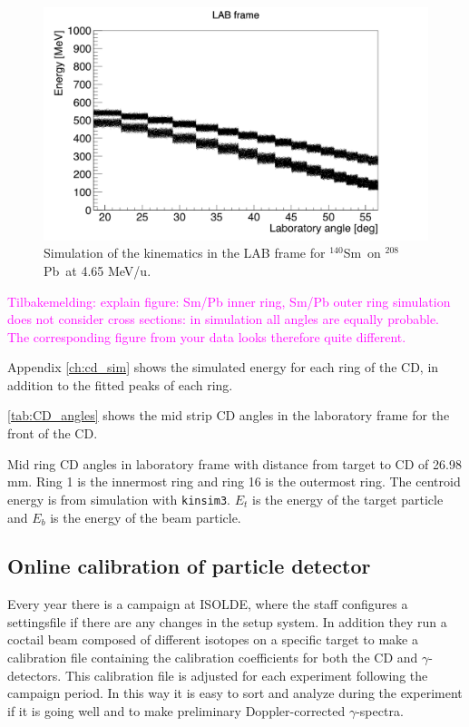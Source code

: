 \documentclass[twoside,english]{uiofysmaster/uiofysmaster}
\newcommand{\Sm}{$^{140}$Sm} %
\newcommand{\Pb}{$^{208}$Pb}
\newcommand{\ga}{$\gamma$}
\begin{document}
\begin{figure}[ht]
	\centering
    \includegraphics[width=\linewidth]{../Plots/simulation/kin_140Sm_208Pb.png}
	\caption{Simulation of the kinematics in the LAB frame for \Sm\ on \Pb\ at 4.65 MeV/u.}
	\label{fig:kinsim}
\end{figure}

\textcolor{Magenta}{Tilbakemelding: \newline 
explain figure: Sm/Pb inner ring, Sm/Pb outer ring \newline
simulation does not consider cross sections: in simulation all angles are equally probable. The corresponding figure from your data looks therefore quite different.
}


Appendix \autoref{ch:cd_sim} shows the simulated energy for each ring of the CD, in addition to the fitted peaks of each ring.


\autoref{tab:CD_angles} shows the mid strip CD angles in the laboratory frame for the front of the CD. 

\begin{table}[ht] 
    \centering 
    \caption{Mid ring CD angles in laboratory frame with distance from target to CD of 26.98 mm. Ring 1 is the innermost ring and ring 16 is the outermost ring. The centroid energy is from simulation with \texttt{kinsim3}. $E_t$ is the energy of the target particle and $E_b$ is the energy of the beam particle.}
	
	\label{tab:CD_angles}
\end{table}




\subsection{Online calibration of particle detector}
Every year there is a campaign at ISOLDE, where the staff configures a settingsfile if there are any changes in the setup system. In addition they run a coctail beam composed of different isotopes on a specific target to make a calibration file containing the calibration coefficients for both the CD and \ga-detectors. This calibration file is adjusted for each experiment following the campaign period. In this way it is easy to sort and analyze during the experiment if it is going well and to make preliminary Doppler-corrected \ga-spectra. 
\end{document}
